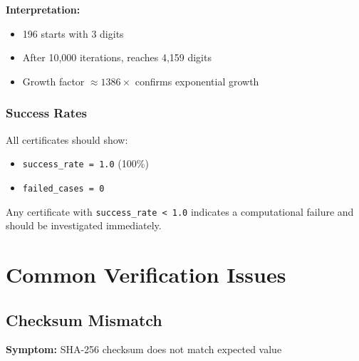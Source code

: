 \documentclass[11pt,a4paper]{article}
\theoremstyle{definition}
\newcommand{\code}[1]{\texttt{#1}}
\begin{document}
\textbf{Interpretation:}
\begin{itemize}
    \item 196 starts with 3 digits
    \item After 10,000 iterations, reaches 4,159 digits
    \item Growth factor $\approx 1386\times$ confirms exponential growth
\end{itemize}

\subsubsection{Success Rates}

All certificates should show:
\begin{itemize}
    \item \code{success\_rate = 1.0} (100\%)
    \item \code{failed\_cases = 0}
\end{itemize}

\begin{criticalbox}[title={Critical Assertion}]
Any certificate with \code{success\_rate < 1.0} indicates a computational failure and should be investigated immediately.
\end{criticalbox}

\section{Common Verification Issues}

\subsection{Checksum Mismatch}

\textbf{Symptom:} SHA-256 checksum does not match expected value
\end{document}
